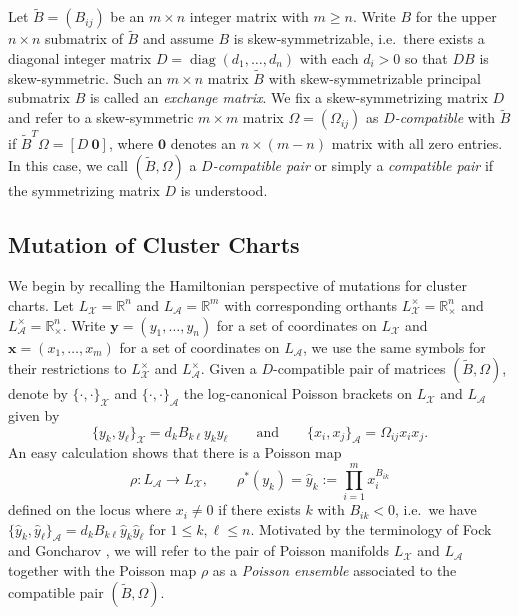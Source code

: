 \documentclass{amsart}
\numberwithin{equation}{section}
\newcommand{\bfx}{{\boldsymbol{x}}}
\newcommand{\bfy}{{\boldsymbol{y}}}
\newcommand{\cA}{\mathcal{A}}
\newcommand{\cX}{\mathcal{X}}
\newcommand{\RR}{\mathbb{R}}
\newcommand{\diag}{\operatorname{diag}}
\begin{document}
Let $\tilde B=(B_{ij})$ be an $m\times n$ integer matrix with $m\ge n$.
Write $B$ for the upper $n\times n$ submatrix of $\tilde B$ and assume $B$ is skew-symmetrizable, i.e.\ there exists a diagonal integer matrix $D=\diag(d_1,\ldots,d_n)$ with each $d_i>0$ so that $DB$ is skew-symmetric. 
Such an $m\times n$ matrix $\tilde B$ with skew-symmetrizable principal submatrix $B$ is called an \emph{exchange matrix}.
We fix a skew-symmetrizing matrix $D$ and refer to a skew-symmetric $m\times m$ matrix $\Omega=(\Omega_{ij})$ as \emph{$D$-compatible} with $\tilde B$ if $\tilde B^T\Omega=[D\ \boldsymbol{0}]$, where $\boldsymbol{0}$ denotes an $n\times(m-n)$ matrix with all zero entries.
In this case, we call $(\tilde B,\Omega)$ a \emph{$D$-compatible pair} or simply a \emph{compatible pair} if the symmetrizing matrix $D$ is understood.

\subsection{Mutation of Cluster Charts}
\label{sec:cluster mutations}

We begin by recalling the Hamiltonian perspective of mutations for cluster charts.
Let $L_\cX=\RR^n$ and $L_\cA=\RR^m$ with corresponding orthants $L^\times_\cX=\RR_\times^n$ and $L^\times_\cA=\RR_\times^n$.
Write $\bfy=(y_1,\ldots,y_n)$ for a set of coordinates on $L_\cX$ and $\bfx=(x_1,\ldots,x_m)$ for a set of coordinates on $L_\cA$, we use the same symbols for their restrictions to $L^\times_\cX$ and $L^\times_\cA$.
Given a $D$-compatible pair of matrices $(\tilde B,\Omega)$, denote by $\{\cdot,\cdot\}_\cX$ and $\{\cdot,\cdot\}_\cA$ the log-canonical Poisson brackets on $L_\cX$ and $L_\cA$ given by
\begin{equation}
  \label{eq:brackets}
  \{y_k,y_\ell\}_\cX=d_kB_{k\ell}y_ky_\ell\qquad\text{and}\qquad\{x_i,x_j\}_\cA=\Omega_{ij}x_ix_j.
\end{equation}
An easy calculation shows that there is a Poisson map
\begin{equation}\label{eq:ensemble}
	\rho:L_\cA\to L_\cX,\qquad \rho^*(y_k)=\hat y_k:=\prod_{i=1}^m x_i^{B_{ik}}
\end{equation}
defined on the locus where $x_i\ne0$ if there exists $k$ with $B_{ik}<0$, i.e.\ we have $\{\hat y_k,\hat y_\ell\}_\cA=d_kB_{k\ell}\hat y_k\hat y_\ell$ for $1\le k,\ell\le n$.
Motivated by the terminology of Fock and Goncharov \cite{FG09a}, we will refer to the pair of Poisson manifolds $L_\cX$ and $L_\cA$ together with the Poisson map $\rho$ as a \emph{Poisson ensemble} associated to the compatible pair $(\tilde B,\Omega)$.
\end{document}
